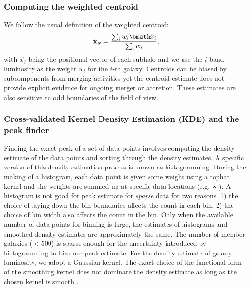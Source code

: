 \subsubsection{Computing the weighted centroid}
\label{subsubsec:weighted_centroid}
We follow the usual definition of the weighted centroid: 
\begin{equation}
	\bar{\bf x}_w = \frac{\sum_i w_i \vec{x}_i}{\sum_i w_i},
\end{equation}
with $\vec{x}_i$ being the positional vector of each subhalo 
and we use the $i$-band luminosity 
as the weight $w_i$ for the $i$-th galaxy.
Centroids can be biased by subcomponents from merging activities yet the
centroid estimate does not provide explicit evidence for ongoing merger or 
accretion. These estimates are also sensitive to odd boundaries 
of the field of view.

\subsubsection{Cross-validated Kernel Density Estimation (KDE) and the peak finder} 
\label{subsubsec:KDE}
Finding the exact peak of a set of data points 
involves computing the density estimate of the data points and sorting through
the density estimates. A specific version of this density estimation process is
known as histogramming. During the making of a histogram, each data point is
given some weight using a tophat kernel and the weights are summed up at
specific data locations (e.g. $\bf{x}_i$). 
A histogram is not good for peak estimate for {\it sparse} data for two reasons: 1) the
choice of laying down the bin boundaries affects the count in each bin, 2) the choice of
bin width also affects the count in the bin. Only when the available number of data points
for binning is large, the estimates of histograms and smoothed density
estimates are approximately the same. The number of member galaxies ($< 500$) 
is sparse enough for the uncertainty introduced by histogramming to bias our
peak estimate. For the density estimate of galaxy luminosity, 
we adopt a Gaussian kernel. 
The exact choice of the functional form of the smoothing kernel does
not dominate the density estimate as long as the chosen kernel is
smooth \citep{Feigelson2014}. 

